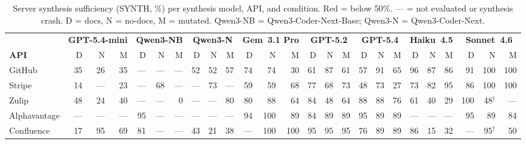 \begin{table}[htbp]
  \centering
  \caption{Server synthesis sufficiency (SYNTH, \%) per synthesis model, API, and condition.
    \colorbox{red!12}{Red} = below 50\%. --- = not evaluated or synthesis crash.
    D = docs, N = no-docs, M = mutated.
    Qwen3-NB = Qwen3-Coder-Next-Base; Qwen3-N = Qwen3-Coder-Next.}
  \label{tab:apx:full_synth}
  \setlength{\tabcolsep}{3pt}
  \scriptsize
  \begin{tabular}{l rrr rrr rrr rrr rrr rrr rrr rrr}
    \toprule
    & \multicolumn{3}{c}{\textbf{GPT-5.4-mini}}
    & \multicolumn{3}{c}{\textbf{Qwen3-NB}}
    & \multicolumn{3}{c}{\textbf{Qwen3-N}}
    & \multicolumn{3}{c}{\textbf{Gem~3.1 Pro}}
    & \multicolumn{3}{c}{\textbf{GPT-5.2}}
    & \multicolumn{3}{c}{\textbf{GPT-5.4}}
    & \multicolumn{3}{c}{\textbf{Haiku~4.5}}
    & \multicolumn{3}{c}{\textbf{Sonnet~4.6}} \\
    \cmidrule(lr){2-4}\cmidrule(lr){5-7}\cmidrule(lr){8-10}\cmidrule(lr){11-13}
    \cmidrule(lr){14-16}\cmidrule(lr){17-19}\cmidrule(lr){20-22}\cmidrule(lr){23-25}
    \textbf{API} & D & N & M & D & N & M & D & N & M & D & N & M & D & N & M & D & N & M & D & N & M & D & N & M \\
    \midrule
    GitHub         & \cellcolor{red!12}35 & \cellcolor{red!12}26 & \cellcolor{red!12}35 & --- & --- & --- & 52 & 52 & 57 & 74 & 74 & \cellcolor{red!12}30 & 61 & 87 & 61 & 57 & 91 & 65 & 96 & 87 & 86 & 91 & 100 & 100 \\
    Stripe         & \cellcolor{red!12}14 & --- & \cellcolor{red!12}23 & --- & 68 & --- & --- & 73 & --- & 59 & 59 & 68 & 77 & 68 & 73 & \cellcolor{red!12}48 & 73 & \cellcolor{red!12}27 & 73 & 82 & 95 & 86 & 100 & 100 \\
    Zulip          & \cellcolor{red!12}48 & \cellcolor{red!12}24 & \cellcolor{red!12}40 & --- & --- & \cellcolor{red!12}0 & --- & --- & 80 & 80 & 88 & 64 & 84 & \cellcolor{red!12}48 & 64 & 88 & 88 & 76 & 61 & \cellcolor{red!12}40 & \cellcolor{red!12}29 & 100 & \cellcolor{red!12}48$^\dagger$ & --- \\
    \midrule
    Alphavantage   & --- & --- & --- & 95 & --- & --- & --- & --- & --- & 94 & 100 & 89 & 84 & 89 & 89 & 95 & 89 & 89 & --- & --- & --- & 95 & 89 & 84 \\
    Confluence     & \cellcolor{red!12}17 & 95 & 69 & 81 & --- & --- & \cellcolor{red!12}43 & \cellcolor{red!12}21 & \cellcolor{red!12}38 & --- & 100 & 100 & 95 & 95 & 95 & 76 & 89 & 89 & 86 & \cellcolor{red!12}15 & \cellcolor{red!12}32 & --- & 95$^\dagger$ & \cellcolor{red!12}50 \\

\end{tabular}
\end{table}
